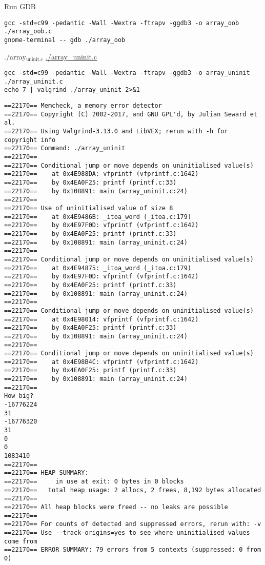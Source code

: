 \documentclass[11pt]{article}
\begin{document}
Run GDB
\begin{verbatim}
gcc -std=c99 -pedantic -Wall -Wextra -ftrapv -ggdb3 -o array_oob ./array_oob.c
gnome-terminal -- gdb ./array_oob
\end{verbatim}

\item ./array\(_{\text{uninit.c}}\)
\label{sec:org278f548}
\url{./array\_uninit.c}

\begin{verbatim}
gcc -std=c99 -pedantic -Wall -Wextra -ftrapv -ggdb3 -o array_uninit ./array_uninit.c
echo 7 | valgrind ./array_uninit 2>&1
\end{verbatim}

\begin{verbatim}
==22170== Memcheck, a memory error detector
==22170== Copyright (C) 2002-2017, and GNU GPL'd, by Julian Seward et al.
==22170== Using Valgrind-3.13.0 and LibVEX; rerun with -h for copyright info
==22170== Command: ./array_uninit
==22170== 
==22170== Conditional jump or move depends on uninitialised value(s)
==22170==    at 0x4E988DA: vfprintf (vfprintf.c:1642)
==22170==    by 0x4EA0F25: printf (printf.c:33)
==22170==    by 0x108891: main (array_uninit.c:24)
==22170== 
==22170== Use of uninitialised value of size 8
==22170==    at 0x4E9486B: _itoa_word (_itoa.c:179)
==22170==    by 0x4E97F0D: vfprintf (vfprintf.c:1642)
==22170==    by 0x4EA0F25: printf (printf.c:33)
==22170==    by 0x108891: main (array_uninit.c:24)
==22170== 
==22170== Conditional jump or move depends on uninitialised value(s)
==22170==    at 0x4E94875: _itoa_word (_itoa.c:179)
==22170==    by 0x4E97F0D: vfprintf (vfprintf.c:1642)
==22170==    by 0x4EA0F25: printf (printf.c:33)
==22170==    by 0x108891: main (array_uninit.c:24)
==22170== 
==22170== Conditional jump or move depends on uninitialised value(s)
==22170==    at 0x4E98014: vfprintf (vfprintf.c:1642)
==22170==    by 0x4EA0F25: printf (printf.c:33)
==22170==    by 0x108891: main (array_uninit.c:24)
==22170== 
==22170== Conditional jump or move depends on uninitialised value(s)
==22170==    at 0x4E98B4C: vfprintf (vfprintf.c:1642)
==22170==    by 0x4EA0F25: printf (printf.c:33)
==22170==    by 0x108891: main (array_uninit.c:24)
==22170== 
How big?
-16776224
31
-16776320
31
0
0
1083410
==22170== 
==22170== HEAP SUMMARY:
==22170==     in use at exit: 0 bytes in 0 blocks
==22170==   total heap usage: 2 allocs, 2 frees, 8,192 bytes allocated
==22170== 
==22170== All heap blocks were freed -- no leaks are possible
==22170== 
==22170== For counts of detected and suppressed errors, rerun with: -v
==22170== Use --track-origins=yes to see where uninitialised values come from
==22170== ERROR SUMMARY: 79 errors from 5 contexts (suppressed: 0 from 0)
\end{verbatim}
\end{document}
